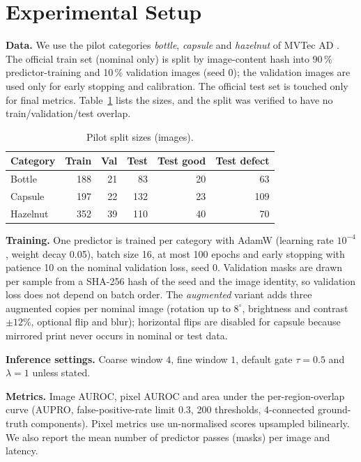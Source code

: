 \documentclass[conference]{IEEEtran}
\begin{document}
\section{Experimental Setup}\label{sec:setup}
\textbf{Data.} We use the pilot categories \emph{bottle}, \emph{capsule} and \emph{hazelnut} of MVTec AD \cite{bergmann2019mvtec}. The official train set (nominal only) is split by image-content hash into 90\,\% predictor-training and 10\,\% validation images (seed 0); the validation images are used only for early stopping and calibration. The official test set is touched only for final metrics. Table~\ref{tab:data} lists the sizes, and the split was verified to have no train/validation/test overlap.

\begin{table}[t]
\caption{Pilot split sizes (images).}
\label{tab:data}
\centering
\footnotesize
\begin{tabular}{lrrrrr}
\hline
\textbf{Category} & \textbf{Train} & \textbf{Val} & \textbf{Test} & \textbf{Test good} & \textbf{Test defect} \\
\hline
Bottle   & 188 & 21 & 83  & 20 & 63 \\
Capsule  & 197 & 22 & 132 & 23 & 109 \\
Hazelnut & 352 & 39 & 110 & 40 & 70 \\
\hline
\end{tabular}
\end{table}

\textbf{Training.} One predictor is trained per category with AdamW (learning rate $10^{-4}$, weight decay 0.05), batch size 16, at most 100 epochs and early stopping with patience 10 on the nominal validation loss, seed 0. Validation masks are drawn per sample from a SHA-256 hash of the seed and the image identity, so validation loss does not depend on batch order. The \emph{augmented} variant adds three augmented copies per nominal image (rotation up to $8^{\circ}$, brightness and contrast $\pm12\%$, optional flip and blur); horizontal flips are disabled for capsule because mirrored print never occurs in nominal or test data.

\textbf{Inference settings.} Coarse window $4$, fine window $1$, default gate $\tau=0.5$ and $\lambda=1$ unless stated.

\textbf{Metrics.} Image AUROC, pixel AUROC and area under the per-region-overlap curve (AUPRO, false-positive-rate limit 0.3, 200 thresholds, 4-connected ground-truth components). Pixel metrics use un-normalised scores upsampled bilinearly. We also report the mean number of predictor passes (masks) per image and latency.
\end{document}
